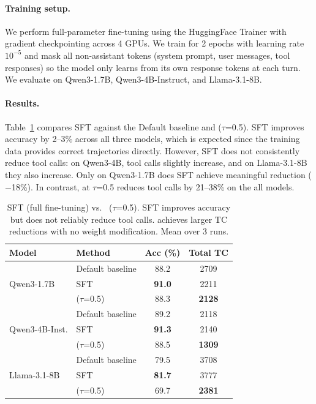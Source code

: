 \paragraph{Training setup.}
We perform full-parameter fine-tuning using the HuggingFace Trainer with gradient checkpointing across 4 GPUs. We train for 2 epochs with learning rate $10^{-5}$ and mask all non-assistant tokens (system prompt, user messages, tool responses) so the model only learns from its own response tokens at each turn. We evaluate on Qwen3-1.7B, Qwen3-4B-Instruct, and Llama-3.1-8B.

\paragraph{Results.}
Table~\ref{tab:sft_results} compares SFT against the Default baseline and \method{} ($\tau$=0.5). SFT improves accuracy by 2--3\% across all three models, which is expected since the training data provides correct trajectories directly. However, SFT does not consistently reduce tool calls: on Qwen3-4B, tool calls slightly increase, and on Llama-3.1-8B they also increase. Only on Qwen3-1.7B does SFT achieve meaningful reduction ($-$18\%). In contrast, \method{} at $\tau$=0.5 reduces tool calls by 21--38\% on the all models.

\begin{table}[H]
\caption{SFT (full fine-tuning) vs.\ \method{} ($\tau$=0.5). SFT improves accuracy but does not reliably reduce tool calls. \method{} achieves larger TC reductions with no weight modification. Mean over 3 runs.}
\label{tab:sft_results}
\centering
\small
\setlength{\tabcolsep}{4pt}
\begin{tabular}{llcc}
\toprule
Model & Method & Acc (\%) & Total TC \\
\midrule
\multirow{3}{*}{Qwen3-1.7B}
  & Default baseline       & 88.2 & 2709 \\
  & SFT                    & \textbf{91.0} & 2211 \\
  & \method{} ($\tau$=0.5) & 88.3 & \textbf{2128} \\
\midrule
\multirow{3}{*}{Qwen3-4B-Inst.}
  & Default baseline       & 89.2 & 2118 \\
  & SFT                    & \textbf{91.3} & 2140 \\
  & \method{} ($\tau$=0.5) & 88.5 & \textbf{1309} \\
\midrule
\multirow{3}{*}{Llama-3.1-8B}
  & Default baseline       & 79.5 & 3708 \\
  & SFT                    & \textbf{81.7} & 3777 \\
  & \method{} ($\tau$=0.5) & 69.7 & \textbf{2381} \\
\bottomrule
\end{tabular}
\end{table}


